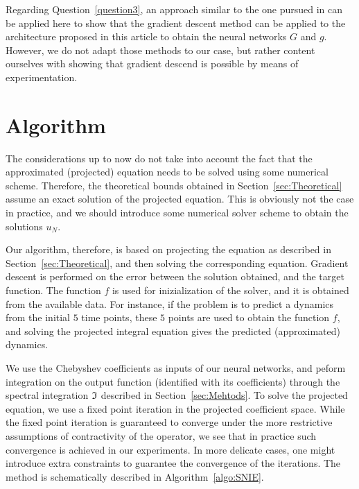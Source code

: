 \documentclass[11pt,fleqn]{amsart} %
\begin{document}
	Regarding Question~\ref{question3}, an approach similar to the one pursued in \cite{NIDE} can be applied here to show that the gradient descent method can be applied to the architecture proposed in this article to obtain the neural networks $G$ and $g$. However, we do not adapt those methods to our case, but rather content ourselves with showing that gradient descend is possible by means of experimentation. 
	
	\section{Algorithm}\label{sec:algo}
	
	The considerations up to now do not take into account the fact that the approximated (projected) equation needs to be solved using some numerical scheme. Therefore, the theoretical bounds obtained in Section~\ref{sec:Theoretical} assume an exact solution of the projected equation. This is obviously not the case in practice, and we should introduce some numerical solver scheme to obtain the solutions $u_N$. 
	
	Our algorithm, therefore, is based on projecting the equation as described in Section~\ref{sec:Theoretical}, and then solving the corresponding equation. Gradient descent is performed on the error between the solution obtained, and the target function. The function $f$ is used for inizialization of the solver, and it is obtained from the available data. For instance, if the problem is to predict a dynamics from the initial $5$ time points, these $5$ points are used to obtain the function $f$, and solving the projected integral equation gives the predicted (approximated) dynamics. 
	
	We use the Chebyshev coefficients as inputs of our neural networks, and peform integration on the output function (identified with its coefficients) through the spectral integration $\frak I$ described in Section~\ref{sec:Mehtods}. To solve the projected equation, we use a fixed point iteration in the projected coefficient space. While the fixed point iteration is guaranteed to converge under the more restrictive assumptions of contractivity of the operator, we see that in practice such convergence is achieved in our experiments. In more delicate cases, one might introduce extra constraints to guarantee the convergence of the iterations. The method is schematically described in Algorithm~\ref{algo:SNIE}.
	
\end{document}
